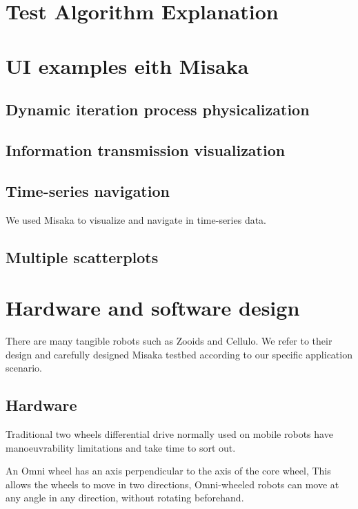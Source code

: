 \documentclass[conference]{IEEEtran}
\begin{document}
\section{Test Algorithm Explanation}


\section{UI examples eith Misaka}

\subsection{Dynamic iteration process physicalization}

\subsection{Information transmission visualization}

\subsection{Time-series navigation}

We used Misaka to visualize and navigate in time-series data.

\subsection{Multiple scatterplots}


\section{Hardware and software design}

There are many tangible robots such as Zooids\cite{le2016zooids} and Cellulo\cite{ozgur2017cellulo}. We refer to their design and carefully designed Misaka testbed according to our specific application scenario.

\subsection{Hardware}

Traditional two wheels differential drive normally used on mobile robots have manoeuvrability limitations and take time to sort out\cite{ribeiro2004three}. 

An Omni wheel has an axis perpendicular to the axis of the core wheel, This allows the wheels to move in two directions, Omni-wheeled robots can move at any angle in any direction, without rotating beforehand.
\end{document}

